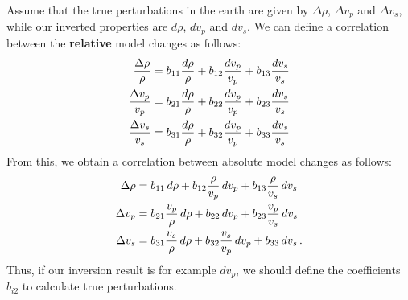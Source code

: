  Assume that the true perturbations in the earth are given by $\Delta\rho$, $\Delta v_p$ and $\Delta v_s$, while our inverted properties are $d\rho$, $dv_p$ and $dv_s$. We can define a correlation between the \textbf{relative} model changes as follows:
\begin{align}
   \frac{\Delta \rho}{\rho} &= b_{11}\frac{d\rho}{\rho} + b_{12}\frac{dv_p}{v_p} + b_{13}\frac{dv_s}{v_s} \notag \\
   \frac{\Delta v_p}{v_p} &= b_{21}\frac{d\rho}{\rho} + b_{22}\frac{dv_p}{v_p} + b_{23}\frac{dv_s}{v_s} \notag \\
   \frac{\Delta v_s}{v_s} &= b_{31}\frac{d\rho}{\rho} + b_{32}\frac{dv_p}{v_p} + b_{33}\frac{dv_s}{v_s}
\end{align}
From this, we obtain a correlation between absolute model changes as follows:
\begin{align}
   \Delta \rho &= b_{11}\,d\rho + b_{12}\frac{\rho}{v_p}\,dv_p + b_{13}\frac{\rho}{v_s}\,dv_s \notag \\
   \Delta v_p &= b_{21}\frac{v_p}{\rho}\,d\rho + b_{22}\,dv_p + b_{23}\frac{v_p}{v_s}\,dv_s \notag \\
   \Delta v_s &= b_{31}\frac{v_s}{\rho}\,d\rho + b_{32}\frac{v_s}{v_p}\,dv_p + b_{33}\,dv_s \,.
\end{align}
Thus, if our inversion result is for example $dv_p$, we should define the coefficients $b_{i2}$ to calculate true perturbations.

